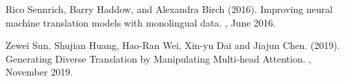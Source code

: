 \documentclass[twoside,twocolumn,10pt]{article}
\begin{document}
\begin{thebibliography}{99}
Rico Sennrich, Barry Haddow, and Alexandra Birch (2016). 
\newblock Improving neural machine translation models with monolingual data. 
, June 2016.

Zewei Sun, Shujian Huang, Hao-Ran Wei, Xin-yu Dai and Jiajun Chen. (2019).
\newblock Generating Diverse Translation by Manipulating Multi-head Attention.
, November 2019.
 
\end{thebibliography}

\end{document}
